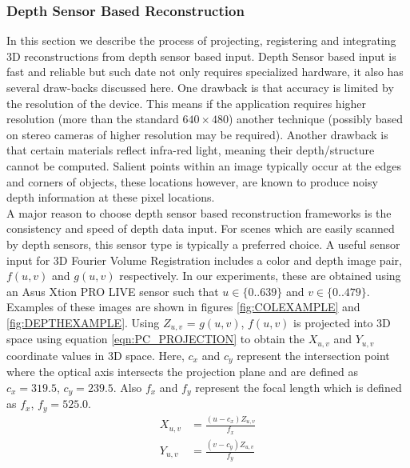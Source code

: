 
\subsubsection{Depth Sensor Based Reconstruction}

In this section we describe the process of projecting, registering and integrating 3D reconstructions from depth sensor based input. Depth Sensor based input is fast and reliable but such date not only requires specialized hardware, it also has several draw-backs discussed here. One drawback is that accuracy is limited by the resolution of the device. This means if the application requires higher resolution (more than the standard $640\times 480$) another technique (possibly based on stereo cameras of higher resolution may be required). Another drawback is that certain materials reflect infra-red light, meaning their depth/structure cannot be computed. Salient points within an image typically occur at the edges and corners of objects, these locations however, are known to produce noisy depth information at these pixel locations. \\

A major reason to choose depth sensor based reconstruction frameworks is the consistency and speed of depth data input. For scenes which are easily scanned by depth sensors, this sensor type is typically a preferred choice. A useful sensor input for 3D Fourier Volume Registration includes a color and depth image pair, $f(u,v)$ and $g(u,v)$ respectively. In our experiments, these are obtained using an Asus Xtion PRO LIVE sensor such that $u \in \{0..639\}$ and $v \in \{0..479\}$. Examples of these images are shown in figures \ref{fig:COLEXAMPLE} and \ref{fig:DEPTHEXAMPLE}. Using $Z_{u,v}$ = $g(u,v)$, $f(u,v)$ is projected into 3D space using equation \ref{eqn:PC_PROJECTION} to obtain the $X_{u,v}$ and $Y_{u,v}$ coordinate values in 3D space. Here, $c_x$ and $c_y$ represent the intersection point where the optical axis intersects the projection plane and are defined as $c_x = 319.5$, $c_y = 239.5$. Also $f_x$ and $f_y$ represent the focal length which is defined as $f_x$, $f_y = 525.0$. \\


\begin{equation} \label{eqn:PC_PROJECTION}
\begin{split}
X_{u,v} & = \frac{(u - c_x)Z_{u,v}}{f_x} \\
Y_{u,v} & = \frac{(v - c_y)Z_{u,v}}{f_y} \\
\end{split}
\end{equation}

